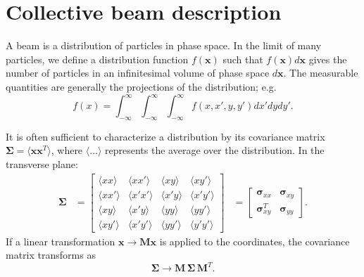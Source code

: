\section{Collective beam description}

A beam is a distribution of particles in phase space. In the limit of many particles, we define a distribution function $f(\mathbf{x})$ such that $f(\mathbf{x}) d\mathbf{x}$ gives the number of particles in an infinitesimal volume of phase space $d\mathbf{x}$. The measurable quantities are generally the projections of the distribution; e.g.
%
\begin{equation}
    f(x) = \int_{-\infty}^{\infty}\int_{-\infty}^{\infty}\int_{-\infty}^{\infty} f(x, x', y, y') dx' dy dy'.
\end{equation}
%

It is often sufficient to characterize a distribution by its covariance matrix {$\bm{\Sigma} = \langle{\mathbf{x}\mathbf{x}^T}\rangle$}, where $\langle{\dots}\rangle$ represents the average over the distribution. In the transverse plane:
%
\begin{equation}\label{eq:covariance_matrix}
\begin{aligned}
    \bm{\Sigma} &= 
    \begin{bmatrix}
        \langle{xx}\rangle & \langle{xx'}\rangle & \langle{xy}\rangle & \langle{xy'}\rangle \\
        \langle{xx'}\rangle & \langle{x'x'}\rangle & \langle{x'y}\rangle & \langle{x'y'}\rangle \\
        \langle{xy}\rangle & \langle{x'y}\rangle & \langle{yy}\rangle & \langle{yy'}\rangle \\
        \langle{xy'}\rangle & \langle{x'y'}\rangle & \langle{yy'}\rangle & \langle{y'y'}\rangle 
    \end{bmatrix}
    &= 
    \begin{bmatrix}
        \bm{\sigma}_{xx} & \bm{\sigma}_{xy} \\
        \bm{\sigma}^T_{xy} & \bm{\sigma}_{yy}
    \end{bmatrix}.
\end{aligned}
\end{equation}
%
If a linear transformation $\mathbf{x} \rightarrow \mathbf{M}\mathbf{x}$ is applied to the coordinates, the covariance matrix transforms as
%
\begin{equation}\label{covariance_matrix_transport}
    \bm{\Sigma} 
    \rightarrow 
    \mathbf{M} \, \bm{\Sigma} \, \mathbf{M}^T.
\end{equation}

